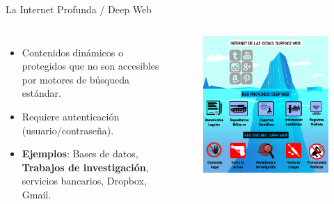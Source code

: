 \documentclass[
11pt, %
]{beamer}
\begin{document}
\begin{frame}{La Internet Profunda / Deep Web}

	\begin{columns}
		\begin{itemize}
			\item Contenidos dinámicos o protegidos que no son accesibles por motores de búsqueda
			      estándar.
			\item Requiere autenticación (usuario/contraseña).
			\item \textbf{Ejemplos}: Bases de datos, \textbf{Trabajos de investigación}, servicios bancarios, Dropbox, Gmail.
		\end{itemize}
		\begin{figure}[H]
			\centering
			\includegraphics[width=1\linewidth]{images/image04}
		\end{figure}
	\end{columns}

\end{frame}
\end{document}
